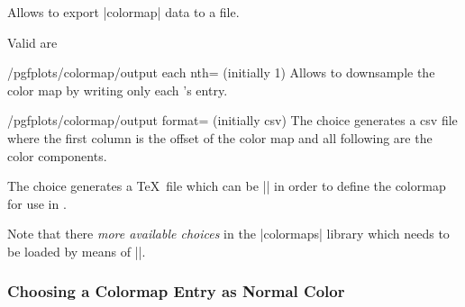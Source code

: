 \begin{command}{\pgfplotscolormaptodatafile{}}
	Allows to export |colormap| data to a file.
\begin{codeexample}[]
\end{codeexample}

\begin{codeexample}[]
\end{codeexample}
	
	Valid  are
	\begin{pgfplotskey}{/pgfplots/colormap/output each nth= (initially 1)}
		Allows to downsample the color map by writing only each 's entry.
	\end{pgfplotskey}
	\begin{pgfplotskey}{/pgfplots/colormap/output format= (initially csv)}
		The choice  generates a csv file where the first column is the offset of the color map and all following are the color components.

		The choice  generates a \TeX\ file which can be || in order to define the colormap for use in \PGFPlots.
	\end{pgfplotskey}
\end{command}


Note that there \emph{more available choices} in the |colormaps| library which needs to be loaded by means of ||.

\subsubsection{Choosing a Colormap Entry as Normal Color}

